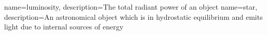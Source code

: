 %
%
{
    name=luminosity,
    description={The total radiant power of an object}
}
{
    name=star,
    description={An astronomical object which is in hydrostatic equilibrium and emits light due to internal sources of energy}
}
